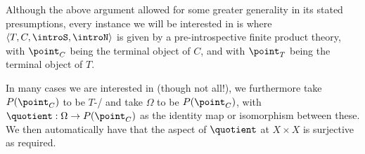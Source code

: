 \begin{corollary}\label{PreIntrospDiagSpecialization}
Although the above argument allowed for some greater generality in its stated presumptions, every instance we will be interested in is where $\langle T, C, \introS, \introN \rangle$ is given by a pre-introspective finite product theory, with $\point_C$ being the terminal object of $C$, and with $\point_T$ being the terminal object of $T$.

In many cases we are interested in (though not all!), we furthermore take $P(\point_C)$ to be $T$-\repsmall/ and take $\Omega$ to be $P(\point_C)$, with $\quotient : \Omega \to P(\point_C)$ as the identity map or isomorphism between these. We then automatically have that the aspect of $\quotient$ at ${X \times X}$ is surjective as required.
\end{corollary}

